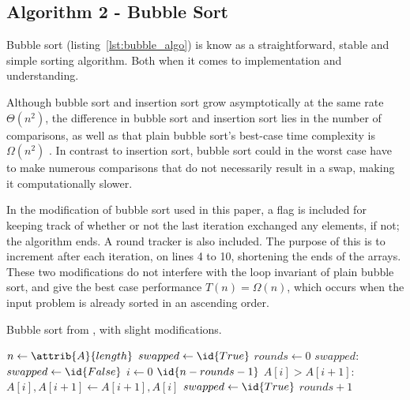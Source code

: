\documentclass[sigconf, nonacm, natbib, screen, balance=False]{acmart}
\begin{document}
\subsection{Algorithm 2 - Bubble Sort}\label{sec:algo2}

Bubble sort (listing~\ref{lst:bubble_algo}) is know as a straightforward, stable and simple sorting algorithm. Both when it comes to implementation and understanding.

Although bubble sort and insertion sort grow asymptotically at the same rate $\Theta(n^2)$, the difference in bubble sort and insertion sort lies in the number of comparisons, as well as that plain bubble sort's best-case time complexity is $\Omega(n^2)$ \citet[Ch.~2.3]{CLRS_2009}. In contrast to insertion sort, bubble sort could in the worst case have to make numerous comparisons that do not necessarily result in a swap, making it computationally slower. 

In the modification of bubble sort used in this paper, a flag is included for keeping track of whether or not the last iteration exchanged any elements, if not; the algorithm ends. A round tracker is also included. The purpose of this is to increment after each iteration, on lines 4 to 10, shortening the ends of the arrays. These two modifications do not interfere with the loop invariant of plain bubble sort, and give the best case performance $T(n) = \Omega(n)$, which occurs when the input problem is already sorted in an ascending order.  


\begin{listing}
  \caption{Bubble sort from \cite{BubbleSo15:online}, with slight modifications.}
  \label{lst:bubble_algo}

  \begin{codebox}
    \li $n \gets \attrib{A}{length}$
    \li $swapped \gets \id{True}$
    \li $rounds \gets 0$
    \li \While $swapped:$
    \li \Do
    $swapped \gets \id{False}$
    \li \For $i \gets 0 $ \To $\id{n - rounds - 1}$
    \li     \Do
    \If $A[i] > A[i+1]:$
    \li     \Do
    $A[i], A[i+1] \gets A[i+1], A[i]$
    \li $swapped \gets \id{True}$
    \End
    \End    
    \li $rounds + 1$
    \End
  \end{codebox}
\end{listing}
\end{document}
